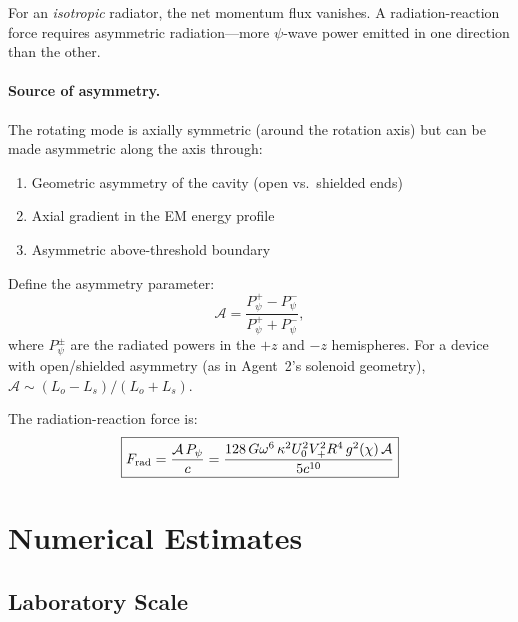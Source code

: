 \documentclass[11pt]{article}
\begin{document}
For an \emph{isotropic} radiator, the net momentum flux vanishes.
A radiation-reaction force requires asymmetric radiation---more
$\psi$-wave power emitted in one direction than the other.

\paragraph{Source of asymmetry.}
The rotating mode is axially symmetric (around the rotation axis) but
can be made asymmetric along the axis through:
\begin{enumerate}
\item Geometric asymmetry of the cavity (open vs.\ shielded ends)
\item Axial gradient in the EM energy profile
\item Asymmetric above-threshold boundary
\end{enumerate}

Define the asymmetry parameter:
\begin{equation}
\mathcal{A} = \frac{P_\psi^+ - P_\psi^-}{P_\psi^+ + P_\psi^-},
\end{equation}
where $P_\psi^\pm$ are the radiated powers in the $+z$ and $-z$
hemispheres. For a device with open/shielded asymmetry
(as in Agent~2's solenoid geometry), $\mathcal{A} \sim (L_o - L_s)/(L_o + L_s)$.

The radiation-reaction force is:
\begin{equation}\label{eq:F-rad}
\boxed{
F_{\rm rad} = \frac{\mathcal{A}\,P_\psi}{c}
= \frac{128\,G\omega^6\,\kappa^2 U_0^2 V_+^2 R^4\,g^2(\chi)
\,\mathcal{A}}{5c^{10}}
}
\end{equation}

\section{Numerical Estimates}\label{sec:numerics}

\subsection{Laboratory Scale}
\end{document}
